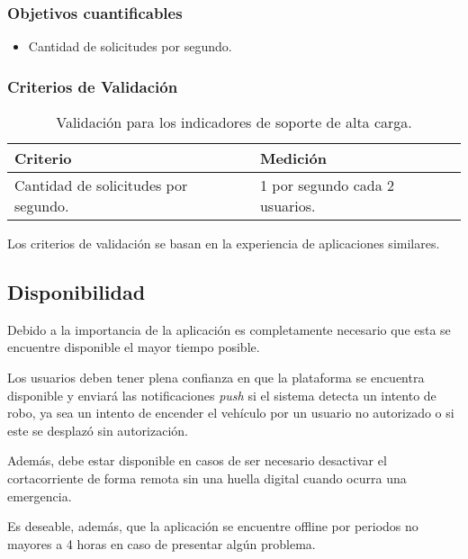 \subsubsection{Objetivos cuantificables}

\begin{itemize}
	\item
	Cantidad de solicitudes por segundo.
\end{itemize}

\subsubsection{Criterios de Validación}

\begin{table}[H]
    \caption[Validación para los indicadores de soporte de alta carga.] {Validación para los indicadores de soporte de alta carga.}
    \label{tbl:Criterios de Validación soporte de alta carga}
    \begin{tabular}{|p{}|p{}|}
        \hline
        \textbf{Criterio} &  \textbf{Medición}\\
    	\hline
    	\hline
    	Cantidad de solicitudes por segundo.  & 1 por segundo cada 2 usuarios.  \\ \hline
    \end{tabular}
\end{table}
Los criterios de validación se basan en la experiencia de aplicaciones similares.

\subsection{Disponibilidad}

Debido a la importancia de la aplicación es completamente necesario que esta se encuentre disponible el mayor tiempo posible.

Los usuarios deben tener plena confianza en que la plataforma se encuentra disponible y enviará las notificaciones \emph{push} si el sistema detecta un intento de robo, ya sea un intento de encender el vehículo por un usuario no autorizado o si este se desplazó sin autorización.

Además, debe estar disponible en casos de ser necesario desactivar el cortacorriente de forma remota sin una huella digital cuando ocurra una emergencia.

Es deseable, además, que la aplicación se encuentre offline por periodos no mayores a 4 horas en caso de presentar algún problema.

